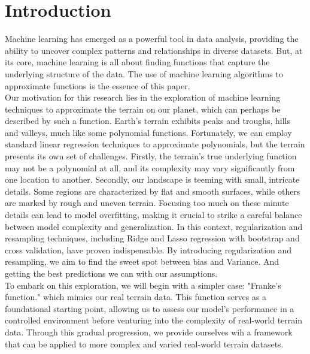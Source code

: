 \documentclass[twoside,11pt]{report}
\begin{document}
\section{Introduction}

Machine learning has emerged as a powerful tool in data analysis, providing the ability to uncover complex 
patterns and relationships in diverse datasets. But, at its core, machine learning is all about finding 
functions that capture the underlying structure of the data. The use of machine learning algorithms 
to approximate functions is the essence of this paper.\\

Our motivation for this research lies in the exploration of machine learning techniques to approximate 
the terrain on our planet, which can perhaps be described by such a function. Earth's terrain exhibits 
peaks and troughs, hills and valleys, much like some polynomial functions. Fortunately, we can employ 
standard linear regression techniques to approximate polynomials, but the terrain presents its own set 
of challenges. Firstly, the terrain's true underlying function may not be a polynomial at all, and its complexity may 
vary significantly from one location to another. Secondly, our landscape is teeming with small, intricate 
details. Some regions are characterized by flat and smooth surfaces, while others are marked by rough and 
uneven terrain. Focusing too much on these minute details can lead to model overfitting, making it crucial 
to strike a careful balance between model complexity and generalization.
In this context, regularization and resampling techniques, including Ridge and Lasso regression with bootstrap
and cross validation, have proven indispensable. By introducing regularization and resampling, we aim to find 
the sweet spot between bias and Variance. And getting the best predictions we can with our assumptions.\\
To embark on this exploration, we will begin with a simpler case: "Franke's function." which mimics our real terrain
data. This function 
serves as a foundational starting point, allowing us to assess our model's performance in a controlled 
environment before venturing into the complexity of real-world terrain data. Through this gradual progression, 
we provide ourselves wih a framework that can be applied to more complex and varied real-world terrain datasets.\\
\end{document}
